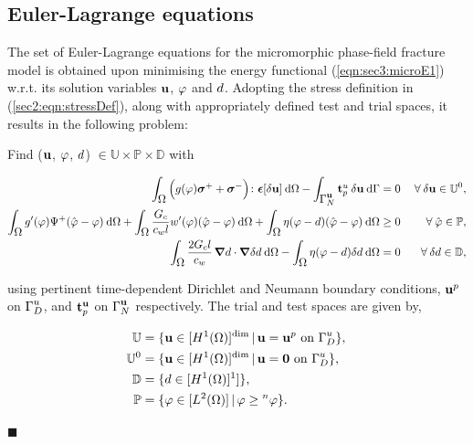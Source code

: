 \documentclass[11pt]{article}
\begin{document}
\subsection{Euler-Lagrange equations}\label{sec:ELLinElast}

The set of Euler-Lagrange equations for the micromorphic phase-field fracture model is obtained upon minimising the energy functional (\ref{eqn:sec3:microE1}) w.r.t. its solution variables $\hbox{$\mathbf{u}$}$, $\hbox{$\varphi$}$ and $\hbox{$d$}$. Adopting the stress definition in (\ref{sec2:eqn:stressDef}), along with appropriately defined test and trial spaces, it results in the following problem:


\begin{vproblem}\label{Problem2}
Find ($\hbox{$\mathbf{u}$}$, $\hbox{$\varphi$}$, $\hbox{$d$}$) $\in \mathbb{U} \times \mathbb{P} \times \mathbb{D}$ with

\begin{subequations}
\begin{align}
\int_{\hbox{$\Omega$}}^{} \Big( g(\hbox{$\varphi$}) \hbox{$\hbox{\boldmath$\sigma$}^+$} + \hbox{$\hbox{\boldmath$\sigma$}^-$} \Big) \colon\hbox{$\hbox{\boldmath$\epsilon$}$}[\hbox{$\delta\mathbf{u}$}] \: \normalfont \text{d} \hbox{$\Omega$} - \int_{\hbox{$\hbox{$\Gamma$}_{N}^{\scriptsize{\hbox{$\mathbf{u}$}}}$}}^{} \hbox{$\mathbf{t}_{p}^{\scriptsize{\hbox{$u$}}}$} \: \hbox{$\delta\mathbf{u}$} \: \normalfont \text{d}\hbox{$\Gamma$} & = 0  & \: \forall \: \hbox{$\delta\mathbf{u}$} \in \mathbb{U}^0, \label{eqn:P2:EL_momentumbalance} \\
\int_{\hbox{$\Omega$}}^{} g'(\hbox{$\varphi$}) \Psi^+ (\hat{\hbox{$\varphi$}}-\hbox{$\varphi$}) \normalfont \: \text{d}\hbox{$\Omega$} + \int_{\hbox{$\Omega$}}^{} \dfrac{\hbox{$G_c$}}{c_w \hbox{$l$}} w'(\hbox{$\varphi$}) (\hat{\hbox{$\varphi$}}-\hbox{$\varphi$}) \: \text{d}\hbox{$\Omega$} + \int_{\hbox{$\Omega$}}^{} \eta (\hbox{$\varphi$}-\hbox{$d$}) (\hat{\hbox{$\varphi$}}-\hbox{$\varphi$}) \: \text{d}\hbox{$\Omega$} & \geq 0 & \: \forall \: \hat{\hbox{$\varphi$}} \in \mathbb{P}, \label{eqn:P2:pf_evolution} \\
\int_{\hbox{$\Omega$}}^{} \dfrac{2 \hbox{$G_c$} \hbox{$l$}}{c_w} \, \hbox{\boldmath$\nabla$} \hbox{$d$}\cdot \hbox{\boldmath$\nabla$} \hbox{$\delta\hbox{$d$}$} \normalfont \: \text{d}\hbox{$\Omega$} - \int_{\hbox{$\Omega$}}^{} \eta (\hbox{$\varphi$}-\hbox{$d$}) \hbox{$\delta\hbox{$d$}$} \: \text{d}\hbox{$\Omega$} & = 0 & \: \forall \: \hbox{$\delta\hbox{$d$}$} \in \mathbb{D}, \label{eqn:P2:mpf_evolution}
\end{align}
\end{subequations}

\noindent using pertinent time-dependent Dirichlet and Neumann boundary conditions, $\hbox{$\mathbf{u}$}^p$ on $\hbox{$\hbox{$\Gamma$}_{D}^{\scriptsize{u}}$}$, and $\hbox{$\mathbf{t}_{p}^{\scriptsize{\hbox{$\mathbf{u}$}}}$}$ on $\hbox{$\hbox{$\Gamma$}_{N}^{\scriptsize{\hbox{$\mathbf{u}$}}}$}$ respectively. The trial and test spaces are given by,

\begin{subequations}
\begin{align}
\mathbb{U} & = \{ \hbox{$\mathbf{u}$} \in [H^1(\hbox{$\Omega$})]^{\normalfont\text{dim}} \,|\, \hbox{$\mathbf{u}$} = \hbox{$\mathbf{u}$}^p \text{ on } \hbox{$\hbox{$\Gamma$}_{D}^{\scriptsize{u}}$} \},  {\label{eqn:P2:disp_space}} \\ 
\mathbb{U}^0 & = \{ \hbox{$\mathbf{u}$} \in [H^1(\hbox{$\Omega$})]^{\normalfont\text{dim}} \,|\, \hbox{$\mathbf{u}$} = \mathbf{0} \text{ on } \hbox{$\hbox{$\Gamma$}_{D}^{\scriptsize{u}}$} \},  {\label{eqn:P2:test_disp_space}} \\
\mathbb{D} & = \{ \hbox{$d$} \in [H^1(\hbox{$\Omega$})]^1] \},  {\label{eqn:P2:mpf_space}} \\ 
\mathbb{P} & = \{ \hbox{$\varphi$} \in [L^2(\hbox{$\Omega$})] \,|\, \hbox{$\varphi$} \geq {}^{n}\hbox{$\varphi$} \}.  {\label{eqn:P2:pf_space}}
\end{align}
\end{subequations}

{\color{black}\hfill $\blacksquare$}
\end{vproblem}
\end{document}
